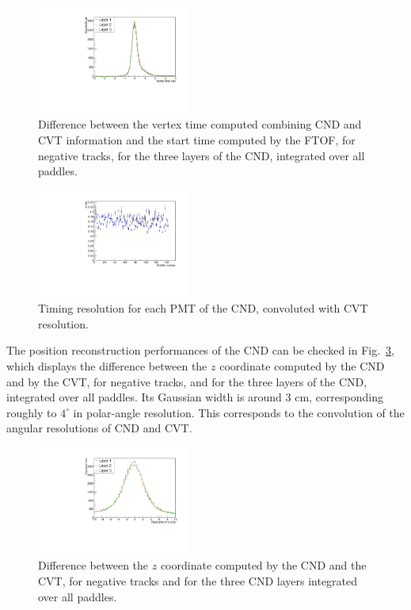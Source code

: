 \begin{figure}[htb]  
\begin{center}
\includegraphics[width=0.45\textwidth]{Figure/canVTPlot.pdf}
\caption {Difference between the vertex time computed combining CND and CVT information and the start time computed by the FTOF, for negative tracks, for the three layers of the CND, integrated over all paddles. }
\label{fig_performance_deltat_layers}
\end{center}
\end{figure}

\begin{figure}[htb]  
\begin{center}
\includegraphics[width=0.45\textwidth]{Figure/VTsigma.pdf}
\caption {Timing resolution for each PMT of the CND, convoluted with CVT resolution.}
\label{fig_performance_vt_sigma_allpaddles}
\end{center}
\end{figure}

The position reconstruction performances of the CND can be checked in Fig.~\ref{fig_performance_deltaz}, which displays the difference between the $z$ coordinate computed by the CND and by the CVT, for negative tracks, and for the three layers of the CND, integrated over all paddles. Its Gaussian width is around 3 cm, corresponding roughly to $4^{\circ}$ in polar-angle resolution. This corresponds to the convolution of the angular resolutions of CND and CVT. 

\begin{figure}[htb]  
\begin{center}
\includegraphics[width=0.45\textwidth]{Figure/canZ.pdf}
\caption {Difference between the $z$ coordinate computed by the CND and the CVT, for negative tracks and for the three CND layers integrated over all paddles. }
\label{fig_performance_deltaz}
\end{center}
\end{figure}


